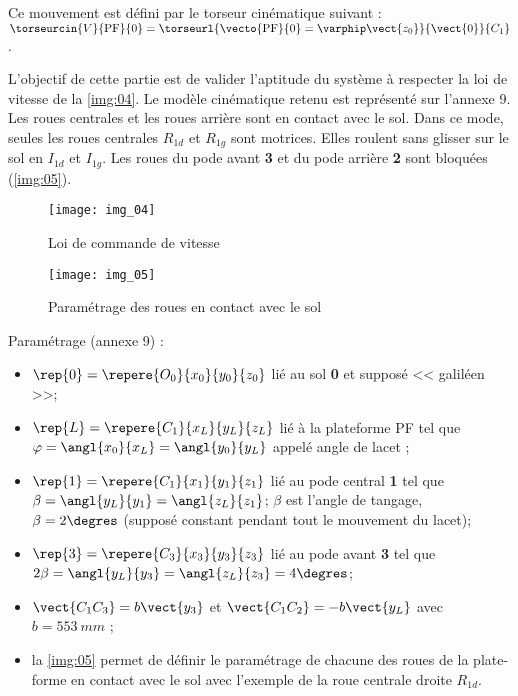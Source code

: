 Ce mouvement est défini par le torseur cinématique suivant : 
$\torseurcin{V}{\text{PF}}{0} = \torseurl{\vecto{\text{PF}}{0}=\varphip \vect{z_0}}{\vect{0}}{C_1}$.


L’objectif de cette partie est de valider l’aptitude du système à respecter la
loi de vitesse de la \autoref{img:04}.
Le modèle cinématique retenu est représenté sur l’annexe 9.
Les roues centrales et les roues arrière sont en contact avec le sol. Dans ce
mode, seules les roues centrales $R_{1d}$ et $R_{1g}$ sont motrices. Elles roulent
sans glisser sur le sol en $I_{1d}$ et $I_{1g}$. Les roues du pode avant \textbf{3} et du pode
arrière \textbf{2} sont bloquées (\autoref{img:05}).



\begin{minipage}[b]{.47\linewidth}
\begin{figure}[H]
\centering
\texttt{[image: img\_04]}
\caption{Loi de commande de vitesse \label{img:04}}
\end{figure}
\end{minipage} \hfill
\begin{minipage}[b]{.47\linewidth}
\begin{figure}[H]
\centering
\texttt{[image: img\_05]}

\caption{Paramétrage des roues en contact avec le sol \label{img:05}}
\end{figure}
\end{minipage} 

\vspace{.5cm}

Paramétrage (annexe 9) : 
\begin{itemize}
\item $\rep{0}=\repere{O_0}{x_0}{y_0}{z_0}$ lié au sol \textbf{0} et supposé << galiléen >>;
\item $\rep{L}=\repere{C_1}{x_L}{y_L}{z_L}$ lié à la plateforme PF tel que $\varphi=\angl{x_0}{x_L}=\angl{y_0}{y_L}$ appelé angle de lacet ;
\item $\rep{1}=\repere{C_1}{x_1}{y_1}{z_1}$ lié au pode central \textbf{1} tel que $\beta=\angl{y_L}{y_1}=\angl{z_L}{z_1}$; $\beta$ est l'angle de tangage, $\beta=2\degres$ (supposé constant pendant tout le mouvement du lacet);
\item $\rep{3}=\repere{C_3}{x_3}{y_3}{z_3}$ lié au pode avant \textbf{3} tel que $2\beta=\angl{y_L}{y_3}=\angl{z_L}{z_3}=4\degres$;
\item $\vect{C_1C_3}=b\vect{y_3}$ et $\vect{C_1C_2}=-b\vect{y_L}$ avec $b = \SI{553}{mm}$ ;
\item la \autoref{img:05} permet de définir le paramétrage de chacune des roues de la plate-forme en contact avec le sol avec
l’exemple de la roue centrale droite $R_{1d}$.
\end{itemize}




